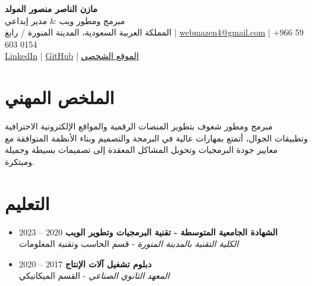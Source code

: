 \documentclass[10pt,a4paper]{article}
\begin{document}
\begin{center}
    {\Huge \bfseries \color{primary} مازن الناصر منصور المولد} \\[4pt]
    {\large \color{accent} مبرمج ومطور ويب \& مدير إبداعي} \\[8pt]
    \small
    المملكة العربية السعودية، المدينة المنورة / رابغ \quad | \quad 
    \href{mailto:webmazen4@gmail.com}{webmazen4@gmail.com} \quad | \quad 
    +966 59 603 0154 \\[2pt]
    \href{https://linkedin.com/in/mazen-almowallad}{LinkedIn} \quad | \quad 
    \href{https://github.com/mazen-mizo}{GitHub} \quad | \quad 
    \href{https://mazen-dev.com}{الموقع الشخصي}
\end{center}

\vspace{6pt}

\section*{الملخص المهني}
مبرمج ومطور شغوف بتطوير المنصات الرقمية والمواقع الإلكترونية الاحترافية وتطبيقات الجوال، أتمتع بمهارات عالية في البرمجة والتصميم وبناء الأنظمة المتوافقة مع معايير جودة البرمجيات وتحويل المشاكل المعقدة إلى تصميمات بسيطة وجميلة ومبتكرة.

\section*{التعليم}
\begin{itemize}[leftmargin=*]
    \item \textbf{الشهادة الجامعية المتوسطة - تقنية البرمجيات وتطوير الويب} \hfill 2020 -- 2023 \\
    \textit{الكلية التقنية بالمدينة المنورة} - قسم الحاسب وتقنية المعلومات
    \item \textbf{دبلوم تشغيل آلات الإنتاج} \hfill 2017 -- 2020 \\
    \textit{المعهد الثانوي الصناعي} - القسم الميكانيكي
\end{itemize}

\end{document}

